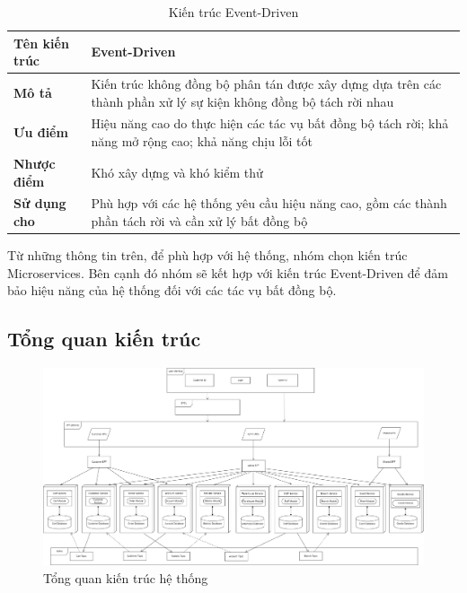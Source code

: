\newpage

\begin{table}[h]
	\begin{tabular}{|p{3cm}|p{12cm}|}
		\hline
		\textbf{Tên kiến trúc} & Event-Driven                                                                                                     \\
		\hline
		\textbf{Mô tả}         & Kiến trúc không đồng bộ phân tán được xây dựng dựa trên các thành phần xử lý sự kiện không đồng bộ tách rời nhau \\
		\hline
		\textbf{Ưu điểm}       & Hiệu năng cao do thực hiện các tác vụ bất đồng bộ tách rời; khả năng mở rộng cao; khả năng chịu lỗi tốt          \\
		\hline
		\textbf{Nhược điểm}    & Khó xây dựng và khó kiểm thử                                                                                     \\
		\hline
		\textbf{Sử dụng cho}   & Phù hợp với các hệ thống yêu cầu hiệu năng cao, gồm các thành phần tách rời và cần xử lý bất đồng bộ             \\
		\hline
	\end{tabular}
	\caption{Kiến trúc Event-Driven}
\end{table}


Từ những thông tin trên, để phù hợp với hệ thống, nhóm chọn kiến trúc Microservices. Bên cạnh đó nhóm sẽ kết hợp với kiến trúc Event-Driven để đảm bảo hiệu năng của hệ thống đối với các tác vụ bất đồng bộ.

\subsection{Tổng quan kiến trúc}

\begin{figure}[!htp]
	\centering
	\includegraphics[width=18cm]{img/Architecture/general-architect.png}
	\newline
	\caption{Tổng quan kiến trúc hệ thống}
\end{figure}


